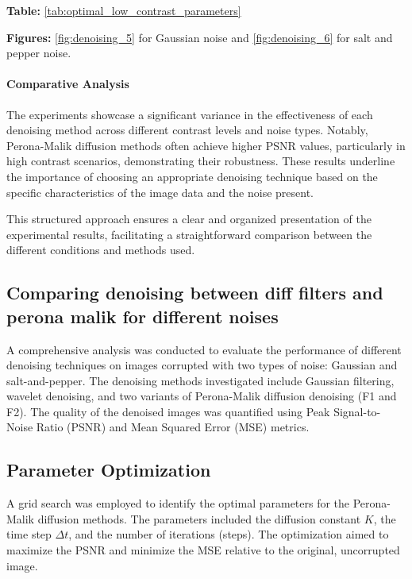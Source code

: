 \documentclass{article}
\begin{document}
\textbf{Table:} \ref{tab:optimal_low_contrast_parameters}

\textbf{Figures:} \ref{fig:denoising_5} for Gaussian noise and \ref{fig:denoising_6} for salt and pepper noise.

\paragraph{Comparative Analysis}
The experiments showcase a significant variance in the effectiveness of each denoising method across different contrast levels and noise types. Notably, Perona-Malik diffusion methods often achieve higher PSNR values, particularly in high contrast scenarios, demonstrating their robustness. These results underline the importance of choosing an appropriate denoising technique based on the specific characteristics of the image data and the noise present.

This structured approach ensures a clear and organized presentation of the experimental results, facilitating a straightforward comparison between the different conditions and methods used.



\subsection{Comparing denoising between diff filters and perona malik for different noises}

A comprehensive analysis was conducted to evaluate the performance of different denoising techniques on images corrupted with two types of noise: Gaussian and salt-and-pepper. The denoising methods investigated include Gaussian filtering, wavelet denoising, and two variants of Perona-Malik diffusion denoising (F1 and F2). The quality of the denoised images was quantified using Peak Signal-to-Noise Ratio (PSNR) and Mean Squared Error (MSE) metrics.

\subsection{Parameter Optimization}
A grid search was employed to identify the optimal parameters for the Perona-Malik diffusion methods. The parameters included the diffusion constant \( K \), the time step \( \Delta t \), and the number of iterations (steps). The optimization aimed to maximize the PSNR and minimize the MSE relative to the original, uncorrupted image.
\end{document}
